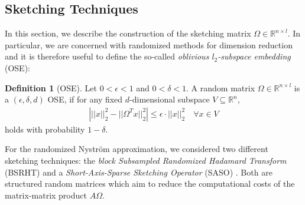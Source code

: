 \documentclass{article}
\theoremstyle{definition}
\newtheorem{definition}{Definition}[section]
\begin{document}
\subsection{Sketching Techniques}
In this section, we describe the construction of the sketching matrix $\Omega \in \mathbb{R}^{n \times l}$. In particular, we are concerned with randomized methods for dimension reduction and it is therefore useful to define the so-called \textit{oblivious $l_2$-subspace embedding} (OSE):
\begin{definition}[OSE]
    Let $0 < \epsilon < 1$ and $0 < \delta < 1$. A random matrix $\Omega \in \mathbb{R}^{n \times l}$ is a $(\epsilon, \delta, d)$ OSE, if for any fixed $d$-dimensional subspace $V \subseteq \mathbb{R}^{n}$, 
    \begin{align*}
        \left| ||x||_2^2 - ||\Omega^T x||_2^2 \right| \leq \epsilon \cdot ||x||_2^2
        \quad \forall x \in V 
    \end{align*}
    holds with probability $1 - \delta$.
\end{definition}

For the randomized Nyström approximation, we considered two different sketching techniques: the \textit{block Subsampled Randomized Hadamard Transform} (BSRHT) \cite{balabanov2022} and a \textit{Short-Axis-Sparse Sketching Operator} (SASO) \cite{murray2023}. Both are structured random matrices which aim to reduce the computational costs of the matrix-matrix product $A \Omega$.
\end{document}
